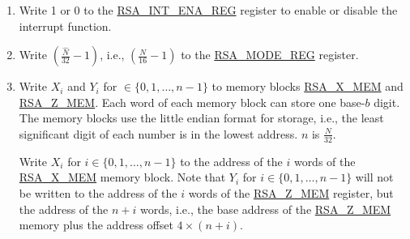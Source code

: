 \documentclass[main\_\_EN.tex]{subfiles}
\begin{document}
\begin{enumerate}

    \item Write 1 or 0 to the \hyperref[regdesc:RSAINTENAREG]{RSA\_INT\_ENA\_REG} register to enable or disable the interrupt function.

    \item Write \begin{math}( \frac{\hat{N}}{32} - 1 )\end{math}, i.e., \begin{math}( \frac{N}{16} - 1 )\end{math} to the \hyperref[regdesc:RSAMODEREG]{RSA\_MODE\_REG} register.

    \item Write \begin{math}{X}_{i}\end{math} and \begin{math}{Y}_{i}\end{math} for \begin{math} \in \{ 0, 1, \dots, n-1 \} \end{math} to memory blocks \hyperref[tab:rsa-mem]{RSA\_X\_MEM} and \hyperref[tab:rsa-mem]{RSA\_Z\_MEM}. Each word of each memory block can store one base-\begin{math}b\end{math} digit. The memory blocks use the little endian format for storage, i.e., the least significant digit of each number is in the lowest address. \begin{math}n\end{math} is \begin{math} \frac{N}{32} \end{math}.

         Write \begin{math}{X}_{i}\end{math} for \begin{math}i \in \{ 0, 1, \dots, n-1 \} \end{math} to the address of the \begin{math}i\end{math} words of the \hyperref[tab:rsa-mem]{RSA\_X\_MEM} memory block. Note that \begin{math}{Y}_{i}\end{math} for \begin{math}i \in \{ 0, 1, \dots, n-1 \} \end{math} will not be written to the address of the \begin{math}i\end{math} words of the \hyperref[tab:rsa-mem]{RSA\_Z\_MEM} register, but the address of the \begin{math}n+i\end{math} words, i.e., the base address of the \hyperref[tab:rsa-mem]{RSA\_Z\_MEM} memory plus the address offset \begin{math}4 \times (n+i) \end{math}.


\end{enumerate}
\end{document}
